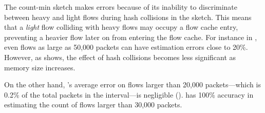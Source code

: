 The count-min sketch makes errors because of its inability to discriminate
between heavy and light flows during hash collisions in the sketch. This means
that a {\em light} flow colliding with heavy flows may occupy a flow cache
entry, preventing a heavier flow later on from entering the flow cache. For
instance in , even flows as large as 50,000 packets can have
estimation errors close to 20\%. However, as  shows, the
effect of hash collisions becomes less significant as memory size increases.

On the other hand, \TheSystem's average error on flows larger than 20,000
packets---which is 0.2\% of the total packets in the interval---is negligible
(). \TheSystem has 100\% accuracy in estimating the count of
flows larger than 30,000 packets.



